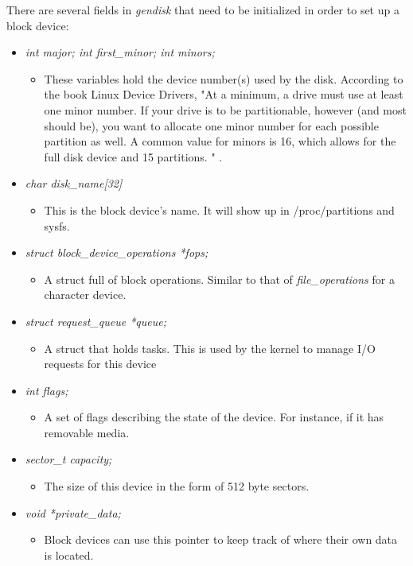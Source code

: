 \documentclass[onecolumn,draftclsnofoot, 10pt, compsoc]{IEEEtran}
\begin{document}
	There are several fields in \textit{gendisk} that need to be initialized in order to set up a block device:
	\begin{itemize}
		\item \textit{int major; int first\_minor; int minors;}
			 \begin{itemize}
			 	\item These variables hold the device number(s) used by the disk. According to the book Linux Device Drivers, "At a minimum, a drive must use at least one minor number. If your drive is to be partitionable, however (and most should be), you want to allocate one minor number for each possible partition as well. A common value for minors is 16, which allows for the full disk device and 15 partitions. " \cite{implLinuxBlock}.
			\end{itemize}
	
		\item \textit{char disk\_name[32]}
			 \begin{itemize}
				\item This is the block device's name. It will show up in /proc/partitions and sysfs.
			\end{itemize}
		
		\item \textit{struct block\_device\_operations *fops;}
		\begin{itemize}
			\item A struct full of block operations. Similar to that of \textit{file\_operations} for a character device.
		\end{itemize}

		\item \textit{struct request\_queue *queue;}
		\begin{itemize}
			\item A struct that holds tasks. This is used by the kernel to manage I/O requests for this device
		\end{itemize}

		\item \textit{int flags;}
		\begin{itemize}
			\item A set of flags describing the state of the device. For instance, if it has removable media.
		\end{itemize}
	
		\item \textit{sector\_t capacity;}
		\begin{itemize}
			\item The size of this device in the form of 512 byte sectors.
		\end{itemize}
	
		\item \textit{void *private\_data;}
		\begin{itemize}
			\item Block devices can use this pointer to keep track of where their own data is located.
		\end{itemize}
	\end{itemize}
\end{document}
